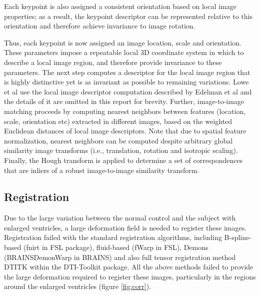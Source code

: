 \documentclass{llncs}
\begin{document}
Each keypoint is also assigned a consistent orientation \cite{Lowe:04} based on local image properties; as a result, the keypoint descriptor can be represented relative to this orientation and therefore achieve invariance to image rotation.

Thus, each keypoint is now assigned an image location, scale and orientation. These parameters impose a repeatable local 3D coordinate system in which to describe a local image region, and therefore provide invariance to these parameters. The next step computes a descriptor for the local image region that is highly distinctive yet is as invariant as possible to remaining variations. Lowe et al \cite{Lowe:04} use the local image descriptor computation described by Edelman et al \cite{Edelman97} and the details of it are omitted in this report for brevity. Further, image-to-image matching proceeds by computing nearest neighbors between features (location, scale, orientation etc) extracted in different images, based on the weighted Euclidean distances of local image descriptors. Note that due to spatial feature normalization, nearest neighbors can be computed despite arbitrary global similarity image transforms (i.e., translation, rotation and isotropic scaling). Finally, the Hough transform is applied to determine a set of correspondences that are inliers of a robust image-to-image similarity transform.

\subsection{Registration}
\label{subsec:registration}
Due to the large variation between the normal control and the subject with enlarged ventricles, a large deformation field is needed to register these images. Registration failed with the standard registration algorithms, including B-spline-based (fnirt in FSL package), fluid-based (fWarp in FSL), Demons (BRAINSDemonWarp in BRAINS) and also full tensor registration method DTITK within the DTI-Toolkit package. All the above methods failed to provide the large deformation required to register these images, particularly in the regions around the enlarged ventricles (figure \ref{fig:corr}).
\end{document}
